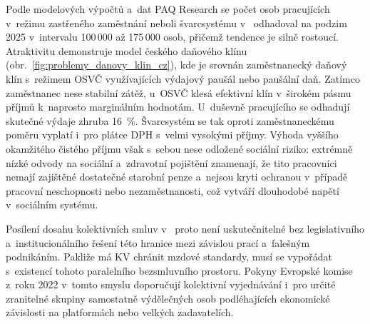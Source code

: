 Podle modelových výpočtů a~dat PAQ Research se počet osob pracujících v~režimu zastřeného zaměstnání neboli švarcsystému v~ odhadoval na podzim 2025 v~intervalu 100\,000 až 175\,000 osob, přičemž tendence je silně rostoucí. Atraktivitu demonstruje model českého daňového klínu (obr.~\ref{fig:problemy_danovy_klin_cz}), kde je srovnán zaměstnanecký daňový klín s~režimem \acs{OSVČ} využívajících výdajový paušál nebo paušální daň. Zatímco zaměstnanec nese stabilní zátěž, u~\acs{OSVČ} klesá efektivní klín v~širokém pásmu příjmů k~naprosto marginálním hodnotám. U~duševně pracujícího se odhadují skutečné výdaje zhruba 16~\%. Švarcsystém se tak oproti zaměstnaneckému poměru vyplatí i~pro plátce \acs{DPH} s~velmi vysokými příjmy. Výhoda vyššího okamžitého čistého příjmu však s~sebou nese odložené sociální riziko: extrémně nízké odvody na sociální a~zdravotní pojištění znamenají, že tito pracovníci nemají zajištěné dostatečné starobní penze a~nejsou kryti ochranou v~případě pracovní neschopnosti nebo nezaměstnanosti, což vytváří dlouhodobé napětí v~sociálním systému.~\cite{PAQ_Svarcsystem}\par



Posílení dosahu kolektivních smluv v~ proto není uskutečnitelné bez legislativního a~institucionálního řešení této hranice mezi závislou prací a~falešným podnikáním. Pakliže má \acs{KV} chránit mzdové standardy, musí se vypořádat s~existencí tohoto paralelního bezsmluvního prostoru. Pokyny Evropské komise z~roku 2022 v~tomto smyslu doporučují kolektivní vyjednávání i~pro určité zranitelné skupiny samostatně výdělečných osob podléhajících ekonomické závislosti na platformách nebo velkých zadavatelích.~\cite{EC_Guidelines_CB_SoloSelfEmployed_2022}\par